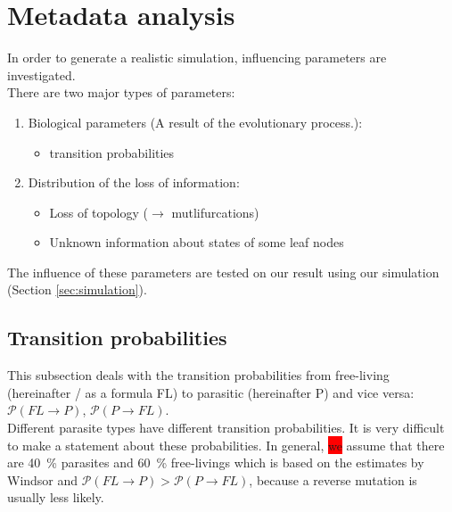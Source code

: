   \section{Metadata analysis}
    In order to generate a realistic simulation, influencing parameters are investigated. \\
    There are two major types of parameters:
    \begin{enumerate}
      \item Biological parameters (A result of the evolutionary process.):
        \begin{itemize}
          \item transition probabilities
        \end{itemize}
      \item Distribution of the loss of information:
        \begin{itemize}
          \item Loss of topology ($\rightarrow$ mutlifurcations)
          \item Unknown information about states of some leaf nodes
        \end{itemize}
    \end{enumerate}
    The influence of these parameters are tested on our result using our simulation (Section 
      \ref{sec:simulation}).
   
    \subsection{Transition probabilities}
      This subsection deals with the transition probabilities from free-living (hereinafter / as a 
        formula FL) to parasitic (hereinafter P) and vice versa: $\mathcal{P}(FL \rightarrow P)$, 
        $\mathcal{P}(P \rightarrow FL)$. \\
      Different parasite types have different transition probabilities. It is very difficult to make a 
        statement about these probabilities.
      In general, \colorbox{red}{we} assume that there are 40~\% parasites and 60~\% free-livings which 
        is based on the estimates by Windsor \cite{Windsor1998} and 
        $\mathcal{P}(FL \rightarrow P) > \mathcal{P}(P \rightarrow FL)$, because a reverse mutation is 
        usually less likely.  \\

